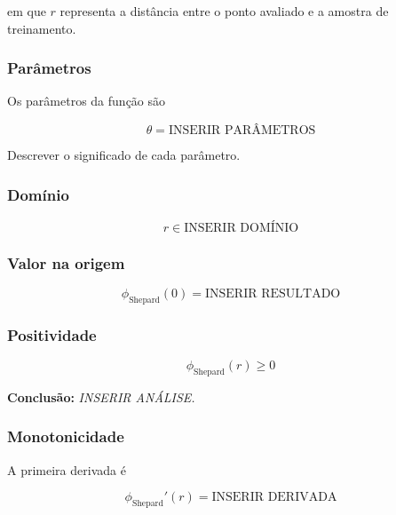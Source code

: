 \documentclass[12pt,a4paper]{article}
\begin{document}
	em que $r$ representa a distância entre o ponto avaliado e a amostra
	de treinamento.
	
	\subsubsection{Parâmetros}
	
	Os parâmetros da função são
	
	\begin{equation}
		\boxed{
			\theta = \text{INSERIR PARÂMETROS}
		}
	\end{equation}
	
	Descrever o significado de cada parâmetro.
	
	\subsubsection{Domínio}
	
	\begin{equation}
		\boxed{
			r\in\text{INSERIR DOMÍNIO}
		}
	\end{equation}
	
	\subsubsection{Valor na origem}
	
	\begin{equation}
		\phi_{\mathrm{Shepard}}(0)
		=
		\boxed{\text{INSERIR RESULTADO}}
	\end{equation}
	
	\subsubsection{Positividade}
	
	\begin{equation}
		\phi_{\mathrm{Shepard}}(r)
		\geq0
	\end{equation}
	
	\textbf{Conclusão:} \textit{INSERIR ANÁLISE.}
	
	\subsubsection{Monotonicidade}
	
	A primeira derivada é
	
	\begin{equation}
		\phi_{\mathrm{Shepard}}'(r)
		=
		\boxed{\text{INSERIR DERIVADA}}
	\end{equation}
	
\end{document}
